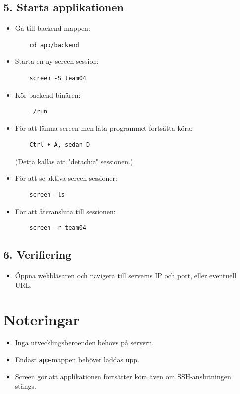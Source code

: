 \documentclass{article}
\begin{document}
\subsection*{5. Starta applikationen}
\begin{itemize}[leftmargin=*]
    \item Gå till backend-mappen:
    \begin{verbatim}
    cd app/backend
    \end{verbatim}

    \item Starta en ny screen-session:
    \begin{verbatim}
    screen -S team04
    \end{verbatim}

    \item Kör backend-binären:
    \begin{verbatim}
    ./run
    \end{verbatim}

    \item För att lämna screen men låta programmet fortsätta köra:
    \begin{verbatim}
    Ctrl + A, sedan D
    \end{verbatim}
    (Detta kallas att "detach:a" sessionen.)

    \item För att se aktiva screen-sessioner:
    \begin{verbatim}
    screen -ls
    \end{verbatim}

    \item För att återansluta till sessionen:
    \begin{verbatim}
    screen -r team04
    \end{verbatim}
\end{itemize}

\subsection*{6. Verifiering}
\begin{itemize}[leftmargin=*]
    \item Öppna webbläsaren och navigera till serverns IP och port, eller eventuell URL.
\end{itemize}

\section*{Noteringar}
\begin{itemize}[leftmargin=*]
    \item Inga utvecklingsberoenden behövs på servern.
    \item Endast \texttt{app}-mappen behöver laddas upp.
    \item Screen gör att applikationen fortsätter köra även om SSH-anslutningen stängs.
\end{itemize}
\end{document}
